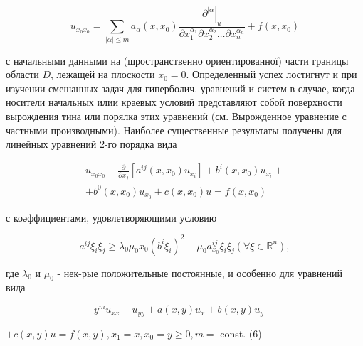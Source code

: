\documentclass[10pt]{article}
\begin{document}
\[

u_{x_{0} x_{0}}=\sum_{|\alpha| \leqslant m} a_{\alpha}\left(x, x_{0}\right) \frac{\left.\partial^{\mid \alpha}\right|_{u}}{\partial x_{1}^{\alpha_{1}} \partial x_{2}^{\alpha_{2}} \ldots \partial x_{n}^{\alpha_{n}}}+f\left(x, x_{0}\right)

\]



с начальными данными на (шространственно ориентированної) части границы области $D$, лежащей на плоскости $x_{0}=0$. Определенный успех лостигнут и при изучении смешанных задач для гиперболич. уравнений и систем в случае, когда носители начальных илии краевых условий представляют собой поверхности вырождения тина или порялка этих уравнениӥ (см. Вырожденное уравнение с частными производными). Наиболее существенные результаты получены для линейных уравнений 2-го порядка вида



\[

\begin{gathered}

u_{x_{0} x_{0}}-\frac{\partial}{\partial x_{j}}\left[a^{i j}\left(x, x_{0}\right) u_{x_{i}}\right]+b^{i}\left(x, x_{0}\right) u_{x_{i}}+ \\

+b^{0}\left(x, x_{0}\right) u_{x_{0}}+c\left(x, x_{0}\right) u=f\left(x, x_{0}\right)

\end{gathered}

\]



с коәффициентами, удовлетворяющими условию



\[

a^{i j} \xi_{i} \xi_{j} \geqslant \lambda_{0} \mu_{0} x_{0}\left(b^{i} \xi_{i}\right)^{2}-\mu_{0} a_{x_{0}}^{i j} \xi_{i} \xi_{j}\left(\forall \xi \in \mathbb{R}^{n}\right),

\]



где $\lambda_{0}$ и $\mu_{0}$ - нек-рые положительные постоянные, и особенно для уравнений вида



\[

y^{m} u_{x x}-u_{y y}+a(x, y) u_{x}+b(x, y) u_{y}+

\]



$+c(x, y) u=f(x, y), x_{1}=x, x_{0}=y \geqslant 0, m=$ const. (6)
\end{document}
